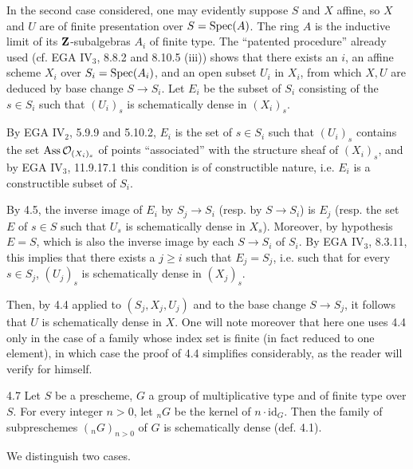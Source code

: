 In the second case considered, one may evidently suppose $S$ and $X$ affine, so $X$ and $U$ are of finite presentation over $S=\operatorname{Spec}(A)$. The ring $A$ is the inductive limit of its $\mathbf{Z}$-subalgebras $A_i$ of finite type. The ``patented procedure'' already used (cf. EGA IV$_3$, 8.8.2 and 8.10.5 (iii)) shows that there exists an $i$, an affine scheme $X_i$ over $S_i=\operatorname{Spec}(A_i)$, and an open subset $U_i$ in $X_i$, from which $X,U$ are deduced by base change $S\to S_i$. Let $E_i$ be the subset of $S_i$ consisting of the $s\in S_i$ such that $(U_i)_s$ is schematically dense in $(X_i)_s$.

 By EGA IV$_2$, 5.9.9 and 5.10.2, $E_i$ is the set of $s\in S_i$ such that $(U_i)_s$ contains the set $\operatorname{Ass}\mathcal{O}_{(X_i)_s}$ of points ``associated'' with the structure sheaf of $(X_i)_s$, and by EGA IV$_3$, 11.9.17.1 this condition is of constructible nature, i.e. $E_i$ is a constructible subset of $S_i$.

\footnotemark[\value{footnote}] By 4.5, the inverse image of $E_i$ by $S_j\to S_i$ (resp. by $S\to S_i$) is $E_j$ (resp. the set $E$ of $s\in S$ such that $U_s$ is schematically dense in $X_s$). Moreover, by hypothesis $E=S$, which is also the inverse image by each $S\to S_i$ of $S_i$. By EGA IV$_3$, 8.3.11, this implies that there exists a $j\geq i$ such that $E_j=S_j$, i.e. such that for every $s\in S_j$, $(U_j)_s$ is schematically dense in $(X_j)_s$.

Then, by 4.4 applied to $(S_j,X_j,U_j)$ and to the base change $S\to S_j$, it follows that $U$ is schematically dense in $X$. One will note moreover that here one uses 4.4 only in the case of a family whose index set is finite (in fact reduced to one element), in which case the proof of 4.4 simplifies considerably, as the reader will verify for himself.
\begin{theorem}{4.7}\label{IX.4.7}
Let $S$ be a prescheme, $G$ a group of multiplicative type and of finite type over $S$. For every integer $n>0$, let ${}_nG$ be the kernel of $n\cdot\mathrm{id}_G$. Then the family of subpreschemes $({}_nG)_{n>0}$ of $G$ is schematically dense (def. 4.1).
\end{theorem}
We distinguish two cases.

